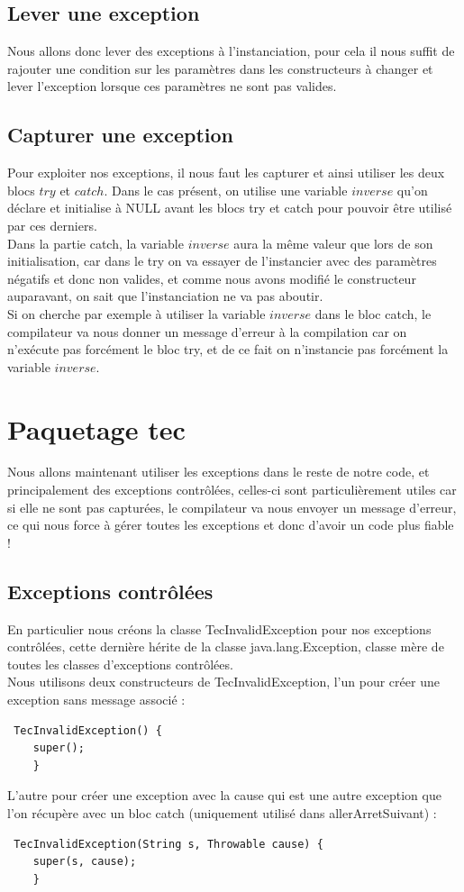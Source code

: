 \documentclass[a4paper,11pt]{article}
\begin{document}
\subsection{Lever une exception}
 Nous allons donc lever des exceptions à l'instanciation, pour cela il nous suffit de rajouter une condition sur les paramètres dans les constructeurs à changer et lever l'exception lorsque ces paramètres ne sont pas valides.\\

\subsection{Capturer une exception}
Pour exploiter nos exceptions, il nous faut les capturer et ainsi utiliser les deux blocs $try$ et $catch$. Dans le cas présent, on utilise une variable $inverse$ qu'on déclare et initialise à NULL avant les blocs try et catch pour pouvoir être utilisé par ces derniers. \\
Dans la partie catch, la variable $inverse$ aura la même valeur que lors de son initialisation, car dans le try on va essayer de l'instancier avec des paramètres négatifs et donc non valides, et comme nous avons modifié le constructeur auparavant, on sait que l'instanciation ne va pas aboutir. \\
Si on cherche par exemple à utiliser la variable $inverse$ dans le bloc catch, le compilateur va nous donner un message d'erreur à la compilation car on n'exécute pas forcément le bloc try, et de ce fait on n'instancie pas forcément la variable $inverse$. \\

\section{Paquetage tec}
Nous allons maintenant utiliser les exceptions dans le reste de notre code, et principalement des exceptions contrôlées, celles-ci sont particulièrement utiles car si elle ne sont pas capturées, le compilateur va nous envoyer un message d'erreur, ce qui nous force à gérer toutes les exceptions et donc d'avoir un code plus fiable !\\

\subsection{Exceptions contrôlées}
En particulier nous créons la classe TecInvalidException pour nos exceptions contrôlées, cette dernière hérite de la classe java.lang.Exception, classe mère de toutes les classes d'exceptions contrôlées. \\
Nous utilisons deux constructeurs de TecInvalidException, l'un pour créer une exception sans message associé :
\begin{lstlisting}
 TecInvalidException() {
	super(); 
    }
\end{lstlisting}
L'autre pour créer une exception avec la cause qui est une autre exception que l'on récupère avec un bloc catch (uniquement utilisé dans allerArretSuivant) :
\begin{lstlisting}
 TecInvalidException(String s, Throwable cause) {
	super(s, cause); 
    }
\end{lstlisting}
\end{document}
